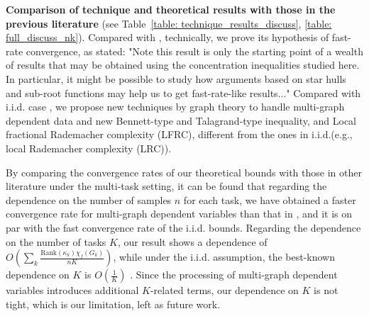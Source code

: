 \documentclass{article}
\begin{document}
\textbf{Comparison of technique and theoretical results with those in the previous literature} (see Table~\ref{table: technique_results_discuss}, \ref{table: full_discuss_nk}). 
Compared with \cite{ralaivola2015entropy}, technically, we prove its hypothesis of fast-rate convergence, as stated: "Note this result is only the starting point of a wealth of results that may be obtained using the concentration inequalities studied here. In particular, it might be possible to study how arguments based on star hulls and sub-root functions may help us to get fast-rate-like results..." 
Compared with i.i.d. case \cite{Bartlett_2005,yousefi18,watkins2023optimistic}, we propose new techniques by graph theory to handle multi-graph dependent data and new Bennett-type and Talagrand-type inequality, and Local fractional Rademacher complexity (LFRC), different from the ones in i.i.d.(e.g., local Rademacher complexity (LRC)). 

By comparing the convergence rates of our theoretical bounds with those in other literature under the multi-task setting, it can be found that regarding the dependence on the number of samples $n$ for each task, we have obtained a faster convergence rate for multi-graph dependent variables than that in \cite{wu2023macro-auc}, and it is on par with the fast convergence rate of the i.i.d. bounds. 
Regarding the dependence on the number of tasks $K$, our result shows a dependence of $O(\sum_k \frac{\mathrm{Rank}(\kappa_k) \chi_f(G_k)}{n K})$, while under the i.i.d. assumption, the best-known dependence on $K$ is $O(\frac{1}{K})$ \cite{yousefi18,watkins2023optimistic}. Since the processing of multi-graph dependent variables introduces additional $K$-related terms, our dependence on $K$ is not tight, which is our limitation, left as future work. 

\end{document}
